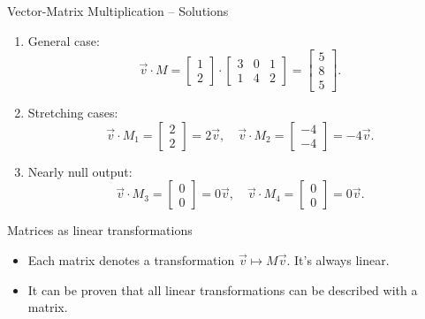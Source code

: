 \documentclass{beamer}
\begin{document}
\begin{frame}{Vector-Matrix Multiplication – Solutions}
  \begin{enumerate}
    \item General case:
    \begin{equation}
    \vec{v} \cdot M = \begin{bmatrix} 1 \\ 2 \end{bmatrix} \cdot
    \begin{bmatrix} 3 & 0 & 1 \\ 1 & 4 & 2 \end{bmatrix}
    = \begin{bmatrix} 5 \\ 8 \\ 5 \end{bmatrix}.
    \end{equation}
    \item Stretching cases:
    \begin{equation}
    \vec{v} \cdot M_1 = \begin{bmatrix} 2 \\ 2 \end{bmatrix}=2\vec{v}, \quad
    \vec{v} \cdot M_2 = \begin{bmatrix} -4 \\ -4 \end{bmatrix} = -4\vec{v}.
    \end{equation}
    \item Nearly null output:
    \begin{equation}
    \vec{v} \cdot M_3 = \begin{bmatrix} 0 \\ 0 \end{bmatrix}=0\vec{v}, \quad
    \vec{v} \cdot M_4 = \begin{bmatrix} 0 \\ 0 \end{bmatrix}=0\vec{v}.
    \end{equation}
  \end{enumerate}
\end{frame}

\begin{frame}{Matrices as linear transformations}

\begin{itemize}
    \item Each matrix denotes a transformation $\vec{v} \mapsto M\vec{v}$. It's always linear.
    \item It can be proven that all linear transformations can be described with a matrix.

\end{itemize}

\end{frame}
\end{document}
